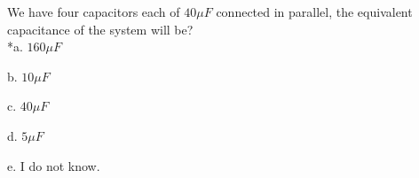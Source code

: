 
We have four capacitors each of \( 40 \mu F \) connected in parallel, the equivalent capacitance of the system will be?\\

*a. \( 160 \mu F \)

b. \( 10 \mu F \)

c. \( 40 \mu F \)

d. \( 5 \mu F \)

e. I do not know.\\
